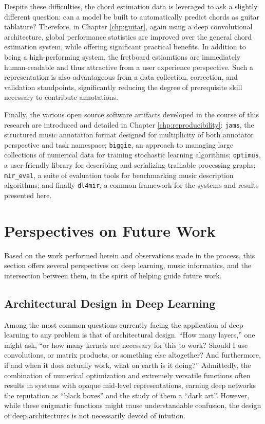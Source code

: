 Despite these difficulties, the chord estimation data is leveraged to ask a slightly different question: can a model be built to automatically predict chords as guitar tablature?
Therefore, in Chapter \ref{chp:guitar}, again using a deep convolutional architecture, global performance statistics are improved over the general chord estimation system, while offering significant practical benefits.
In addition to being a high-performing system, the fretboard estiamtions are immediately human-readable and thus attractive from a user experience perspective.
Such a representation is also advantageous from a data collection, correction, and validation standpoints, significantly reducing the degree of prerequisite skill necessary to contribute annotations.

Finally, the various open source software artifacts developed in the course of this research are introduced and detailed in Chapter \ref{chp:reproducibility}:
\texttt{jams}, the structured music annotation format designed for multiplicity of both annotator perspective and task namespace;
\texttt{biggie}, an approach to managing large collections of numerical data for training stochastic learning algorithms;
\texttt{optimus}, a user-friendly library for describing and serializing trainable processing graphs;
\texttt{mir\_eval}, a suite of evaluation tools for benchmarking music description algorithms;
and finally \texttt{dl4mir}, a common framework for the systems and results presented here.


\section{Perspectives on Future Work}
\label{sec:future}

Based on the work performed herein and observations made in the process, this section offers several perspectives on deep learning, music informatics, and the intersection between them, in the spirit of helping guide future work.


\subsection{Architectural Design in Deep Learning}

Among the most common questions currently facing the application of deep learning to any problem is that of architectural design.
``How many layers,'' one might ask, ``or how many kernels are necessary for this to work?
Should I use convolutions, or matrix products, or something else altogether?
And furthermore, if and when it does actually work, what on earth is it doing?''
Admittedly, the combination of numerical optimization and extremely versatile functions often results in systems with opaque mid-level representations, earning deep networks the reputation as ``black boxes'' and the study of them a ``dark art''.
However, while these enigmatic functions might cause understandable confusion, the design of deep architectures is not necessarily devoid of intution.

